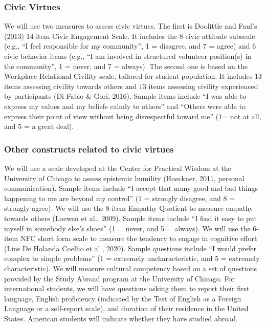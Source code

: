 \documentclass[
  man,
  floatsintext,
  longtable,
  nolmodern,
  notxfonts,
  notimes,
  colorlinks=true,linkcolor=blue,citecolor=blue,urlcolor=blue]{apa7}
\begin{document}
\subsubsection{Civic Virtues}\label{civic-virtues}

We will use two measures to assess civic virtues. The first is Doolittle
and Faul's (2013) 14-item Civic Engagement Scale. It includes the 8
civic attitude subscale (e.g., ``I feel responsible for my community'',
1 = disagree, and 7 = agree) and 6 civic behavior items (e.g., ``I am
involved in structured volunteer position(s) in the community'', 1 =
never, and 7 = always). The second one is based on the Workplace
Relational Civility scale, tailored for student population. It includes
13 items assessing civility towards others and 13 items assessing
civility experienced by participants (Di Fabio \& Gori, 2016). Sample
items include ``I was able to express my values and my beliefs calmly to
others'' and ``Others were able to express their point of view without
being disrespectful toward me'' (1= not at all, and 5 = a great deal).

\subsubsection{Other constructs related to civic
virtues}\label{other-constructs-related-to-civic-virtues}

We will use a scale developed at the Center for Practical Wisdom at the
University of Chicago to assess epistemic humility (Hoeckner, 2011,
personal communication). Sample items include ``I accept that many good
and bad things happening to me are beyond my control'' (1 = strongly
disagree, and 8 = strongly agree). We will use the 8-item Empathy
Quotient to measure empathy towards others (Loewen et al., 2009). Sample
items include ``I find it easy to put myself in somebody else's shoes''
(1 = never, and 5 = always). We will use the 6-item NFC short form scale
to measure the tendency to engage in cognitive effort (Lins De Holanda
Coelho et al., 2020). Sample questions include ``I would prefer complex
to simple problems'' (1 = extremely uncharacteristic, and 5 = extremely
characteristic). We will measure cultural competency based on a set of
questions provided by the Study Abroad program at the University of
Chicago. For international students, we will have questions asking them
to report their first language, English proficiency (indicated by the
Test of English as a Foreign Language or a self-report scale), and
duration of their residence in the United States. American students will
indicate whether they have studied abroad.
\end{document}
